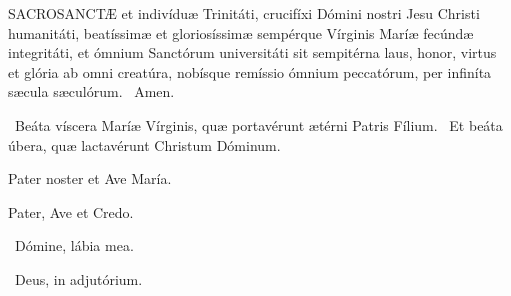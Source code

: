 
\lettrine[lines=2]{S}{ACROSANCTÆ} et indivíduæ Trinitáti, crucifíxi Dómini nostri Jesu Christi humanitáti, beatíssimæ et gloriosíssimæ sempérque Vírginis Maríæ fecúndæ integritáti, et ómnium Sanctórum universitáti sit sempitérna laus, honor, virtus et glória ab omni creatúra, nobísque remíssio ómnium peccatórum, per infiníta sæcula sæculórum. \R\ Amen.

\V\ Beáta víscera Maríæ Vírginis, quæ portavérunt ætérni Patris Fílium. \R\ Et beáta úbera, quæ lactavérunt Christum Dóminum.

 Pater noster et Ave María.





Pater, Ave et Credo.

\V\ Dómine, lábia mea.

\V\ Deus, in adjutórium.

